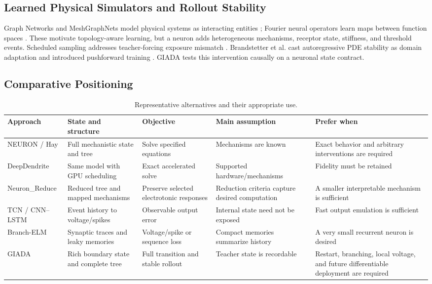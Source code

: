 \documentclass[11pt]{article}
\begin{document}
\subsection{Learned Physical Simulators and Rollout Stability}

Graph Networks and MeshGraphNets model physical systems as interacting entities
\cite{sanchez2020,pfaff2021}; Fourier neural operators learn maps between
function spaces \cite{li2021}. These motivate topology-aware learning, but a
neuron adds heterogeneous mechanisms, receptor state, stiffness, and threshold
events. Scheduled sampling addresses teacher-forcing exposure mismatch
\cite{bengio2015}. Brandstetter et al. cast autoregressive PDE stability as
domain adaptation and introduced pushforward training \cite{brandstetter2022}.
GIADA tests this intervention causally on a neuronal state contract.

\subsection{Comparative Positioning}

\begin{table}[t]
\centering
\caption{Representative alternatives and their appropriate use.}
\label{tab:related-positioning}
\small
\begin{tabularx}{\textwidth}{p{2.3cm}YYYY}
\toprule
Approach & State and structure & Objective & Main assumption & Prefer when \\
\midrule
NEURON / Hay & Full mechanistic state and tree & Solve specified equations &
Mechanisms are known & Exact behavior and arbitrary interventions are required \\
DeepDendrite & Same model with GPU scheduling & Exact accelerated solve &
Supported hardware/mechanisms & Fidelity must be retained \\
Neuron\_Reduce & Reduced tree and mapped mechanisms & Preserve selected
electrotonic responses & Reduction criteria capture desired computation & A
smaller interpretable mechanism is sufficient \\
TCN / CNN--LSTM & Event history to voltage/spikes & Observable output error &
Internal state need not be exposed & Fast output emulation is sufficient \\
Branch-ELM & Synaptic traces and leaky memories & Voltage/spike or sequence loss
& Compact memories summarize history & A very small recurrent neuron is desired \\
GIADA & Rich boundary state and complete tree & Full transition and stable
rollout & Teacher state is recordable & Restart, branching, local voltage, and
future differentiable deployment are required \\
\bottomrule
\end{tabularx}
\end{table}
\end{document}
